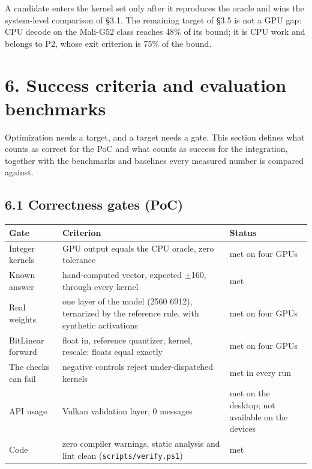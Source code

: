 \documentclass[
  10pt,
]{article}
\newcounter{none} %
\begin{document}
A candidate enters the kernel set only after it reproduces the oracle
and wins the system-level comparison of \S{}3.1. The remaining target of
\S{}3.5 is not a GPU gap: CPU decode on the Mali-G52 class reaches 48\%
of its bound; it is CPU work and belongs to P2, whose exit criterion is
75\% of the bound.

\section{6. Success criteria and evaluation
benchmarks}\label{success-criteria-and-evaluation-benchmarks}

Optimization needs a target, and a target needs a gate. This section
defines what counts as correct for the PoC and what counts as success
for the integration, together with the benchmarks and baselines every
measured number is compared against.

\subsection{6.1 Correctness gates (PoC)}\label{correctness-gates-poc}

{\def\LTcaptype{none} %
\begin{longtable}[]{@{}
  >{\raggedright\arraybackslash}p{}
  >{\raggedright\arraybackslash}p{}
  >{\raggedright\arraybackslash}p{}@{}}
\toprule\noalign{}
\begin{minipage}[b]{\linewidth}\raggedright%
Gate
\end{minipage} & \begin{minipage}[b]{\linewidth}\raggedright%
Criterion
\end{minipage} & \begin{minipage}[b]{\linewidth}\raggedright%
Status
\end{minipage} \\
\midrule\noalign{}
\endhead%
\bottomrule\noalign{}
\endlastfoot%
Integer kernels & GPU output equals the CPU oracle, zero tolerance & met
on four GPUs \\
Known answer & hand-computed vector, expected $\pm$160, through every kernel
& met \\
Real weights & one layer of the model (2560 \texttimes{} 6912), ternarized by the
reference rule, with synthetic activations & met on four GPUs \\
BitLinear forward & float in, reference quantizer, kernel, rescale:
floats equal exactly & met on four GPUs \\
The checks can fail & negative controls reject under-dispatched kernels
& met in every run \\
API usage & Vulkan validation layer, 0 messages & met on the desktop;
not available on the devices \\
Code & zero compiler warnings, static analysis and lint clean
(\texttt{scripts/verify.ps1}) & met \\
\end{longtable}
}
\end{document}

